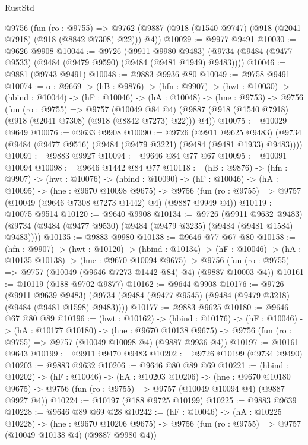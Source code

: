 \begin{lexlean}{RustStd}
\begin{coremodule}
  @9756
    (fun (ro : @9755) =>
    @9762 (@9887 (@918 (@1540 @9747) (@918 (@2041 @7918) (@918 (@8842 @7308) @22))) @4))
@10029 := @9977 @9491
@10030 := @9626 @9908
@10044 := @9726
    (@9911 @9980 @9483)
    (@9734 (@9484 (@9477 @9533) (@9484 (@9479 @9590) (@9484 (@9481 @1949) @9483))))
@10046 := @9881 (@9743 @9491)
@10048 := @9883 @9936 @80
@10049 := @9758 @9491
@10074 := {o : @9669} ->
  (hB : @9876) ->
  (hfn : @9907) ->
  (hwt : @10030) ->
  (hbind : @10044) ->
  (hF : @10046) ->
  (hA : @10048) ->
  (hne : @9753) ->
  @9756
    (fun (ro : @9755) =>
    @9757
      (@10049 @84 @4)
      (@9887 (@918 (@1540 @7918) (@918 (@2041 @7308) (@918 (@8842 @7273) @22))) @4))
@10075 := @10029 @9649
@10076 := @9633 @9908
@10090 := @9726
    (@9911 @9625 @9483)
    (@9734 (@9484 (@9477 @9516) (@9484 (@9479 @3221) (@9484 (@9481 @1933) @9483))))
@10091 := @9883 @9927
@10094 := @9646 @84 @77 @67
@10095 := @10091 @10094
@10098 := @9646 @1442 @84 @77
@10118 := (hB : @9876) ->
  (hfn : @9907) ->
  (hwt : @10076) ->
  (hbind : @10090) ->
  (hF : @10046) ->
  (hA : @10095) ->
  (hne : @9670 @10098 @9675) ->
  @9756 (fun (ro : @9755) => @9757 (@10049 (@9646 @7308 @7273 @1442) @4) (@9887 @9949 @4))
@10119 := @10075 @9514
@10120 := @9640 @9908
@10134 := @9726
    (@9911 @9632 @9483)
    (@9734 (@9484 (@9477 @9530) (@9484 (@9479 @3235) (@9484 (@9481 @1584) @9483))))
@10135 := @9883 @9980
@10138 := @9646 @77 @67 @80
@10158 := (hfn : @9907) ->
  (hwt : @10120) ->
  (hbind : @10134) ->
  (hF : @10046) ->
  (hA : @10135 @10138) ->
  (hne : @9670 @10094 @9675) ->
  @9756 (fun (ro : @9755) => @9757 (@10049 (@9646 @7273 @1442 @84) @4) (@9887 @10003 @4))
@10161 := @10119 (@188 @9702 @9877)
@10162 := @9644 @9908
@10176 := @9726
    (@9911 @9639 @9483)
    (@9734 (@9484 (@9477 @9545) (@9484 (@9479 @3218) (@9484 (@9481 @1598) @9483))))
@10177 := @9883 @9625
@10180 := @9646 @67 @80 @89
@10196 := (hwt : @10162) ->
  (hbind : @10176) ->
  (hF : @10046) ->
  (hA : @10177 @10180) ->
  (hne : @9670 @10138 @9675) ->
  @9756 (fun (ro : @9755) => @9757 (@10049 @10098 @4) (@9887 @9936 @4))
@10197 := @10161 @9643
@10199 := @9911 @9470 @9483
@10202 := @9726 @10199 (@9734 @9490)
@10203 := @9883 @9632
@10206 := @9646 @80 @89 @69
@10221 := (hbind : @10202) ->
  (hF : @10046) ->
  (hA : @10203 @10206) ->
  (hne : @9670 @10180 @9675) ->
  @9756 (fun (ro : @9755) => @9757 (@10049 @10094 @4) (@9887 @9927 @4))
@10224 := @10197 (@188 @9725 @10199)
@10225 := @9883 @9639
@10228 := @9646 @89 @69 @28
@10242 := (hF : @10046) ->
  (hA : @10225 @10228) ->
  (hne : @9670 @10206 @9675) ->
  @9756 (fun (ro : @9755) => @9757 (@10049 @10138 @4) (@9887 @9980 @4))

\end{coremodule}
\end{lexlean}
